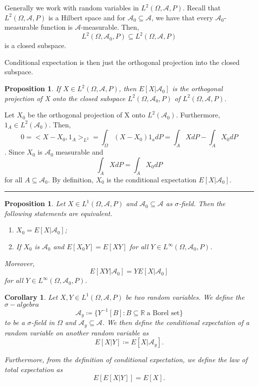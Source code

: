 \documentclass[twoside]{article}
\newtheorem{proposition}[theorem]{Proposition}
\newtheorem{corollary}[theorem]{Corollary}
\newenvironment{proof}{{\bf Proof:}}{\hfill\rule{2mm}{2mm}}
\newcommand{\sa}{\sigma-algebra}
\begin{document}
Generally we work with random variables in $L^2(\Omega, \mathcal{A}, P)$. Recall that $L^2(\Omega, \mathcal{A}, P)$ is a Hilbert space and for $\mathcal{A}_0 \subseteq \mathcal{A}$, we have that every $\mathcal{A}_0$-measurable function is $\mathcal{A}$-measurable. Then,
$$
L^2(\Omega, \mathcal{A}_0, P) \subseteq L^2(\Omega, \mathcal{A}, P)
$$
is a closed subspace.


Conditional expectation is then just the orthogonal projection into the closed subspace.

\begin{proposition} If $X \in L^2(\Omega, \mathcal{A}, P)$, then $E[X|\mathcal{A}_0]$ is the orthogonal projection of X onto the closed subspace $L^2(\Omega, \mathcal{A}_0, P)$ of $L^2(\Omega, \mathcal{A}, P)$.
\end{proposition}

\begin{proof} Let $X_0$ be the orthogonal projection of X onto $L^2(\mathcal{A}_0)$. Furthermore, $1_A \in L^2(\mathcal{A}_0)$. Then,
$$0 = <X - X_0, 1_A>_{L^2} = \int_{\Omega}(X - X_0)1_adP = \int_{A}XdP - \int_{A}X_0dP$$. Since $X_0$ is $\mathcal{A}_0$ measurable and 
$$
\int_{A}XdP = \int_AX_0dP
$$
for all $A \subseteq \mathcal{A}_0$. By definition, $X_0$ is the conditional expectation $E[X|\mathcal{A}_0]$.
\end{proof}

\begin{proposition} Let $X \in L^1(\Omega, \mathcal{A}, P)$ and $\mathcal{A}_0 \subseteq \mathcal{A}$ as $\sigma$-field. Then the following statements are equivalent. 

\begin{enumerate}
    \item $X_0 = E[X|\mathcal{A}_0]$;
    \item If $X_0$ is $\mathcal{A}_0$ and $E[X_0Y] = E[XY]$ for all $Y \in L^{\infty}(\Omega, \mathcal{A}_0, P)$.
\end{enumerate}

Moreover,
$$
E[XY|\mathcal{A}_0] = YE[X|\mathcal{A}_0]
$$
for all $Y \in L^{\infty}(\Omega, \mathcal{A}_0, P)$.
\end{proposition}

\begin{corollary} Let $X,Y \in L^1(\Omega, \mathcal{A}, P)$ be two random variables. We define the $\sa$
$$
\mathcal{A}_y \coloneqq \{Y^{-1}[B]: B \subseteq \mathbb{R} \; \text{a Borel set}\}
$$
to be a $\sigma$-field in $\Omega$ and $\mathcal{A}_y \subseteq \mathcal{A}$. We then define the conditional expectation of a random variable on another random variable as
$$
E[X|Y] \coloneqq E[X|\mathcal{A}_y].
$$

Furthermore, from the definition of conditional expectation, we define the law of total expectation as
$$
E[E[X|Y]] = E[X].
$$
\end{corollary}
\end{document}
